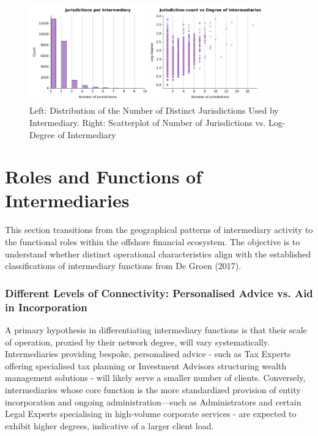 \begin{figure}[htbp]
    \centering
    \includegraphics[width=0.9\textwidth]{images/Geography_Distribution_of_Jurisdictions_by_Intermediary.png} %
    \caption{Left: Distribution of the Number of Distinct Jurisdictions Used by Intermediary. Right: Scatterplot of Number of Jurisdictions vs. Log-Degree of Intermediary}
    \label{fig:geography_distribution_jurisdictions_by_intermediary}
\end{figure}


\section{Roles and Functions of Intermediaries}
\label{sec:functional_specialisation}

This section transitions from the geographical patterns of intermediary activity to the functional roles within the offshore financial ecosystem. The objective is to understand whether distinct operational characteristics align with the established classifications of intermediary functions from De Groen (2017). 

\subsubsection{Different Levels of Connectivity: Personalised Advice vs. Aid in Incorporation}
\label{subsubsec:connectivity_functional}

A primary hypothesis in differentiating intermediary functions is that their scale of operation, proxied by their network degree, will vary systematically. Intermediaries providing bespoke, personalised advice - such as Tax Experts offering specialised tax planning or Investment Advisors structuring wealth management solutions - will likely serve a smaller number of clients. Conversely, intermediaries whose core function is the more standardized provision of entity incorporation and ongoing administration—such as Administrators and certain Legal Experts specialising in high-volume corporate services - are expected to exhibit higher degrees, indicative of a larger client load.

